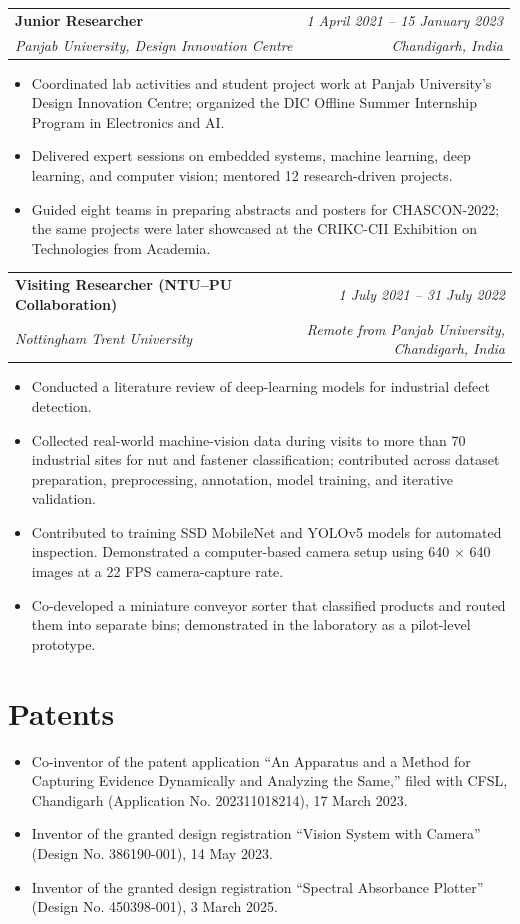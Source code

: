 \documentclass[a4paper,11pt]{article}
\makeatletter
\newcommand{\roleentry}[4]{%
  \begin{tabular*}{\textwidth}{@{}l@{\extracolsep{\fill}}r@{}}
    \textbf{#1} & \textit{#2} \\
    \textit{#3} & \textit{#4} \\
  \end{tabular*}\par\vspace{-3pt}%
}
\newcommand{\cvbullet}[1]{\item #1}
\makeatother
\begin{document}
\roleentry{Junior Researcher}{1 April 2021 -- 15 January 2023}{Panjab University, Design Innovation Centre}{Chandigarh, India}
\begin{itemize}
  \cvbullet{Coordinated lab activities and student project work at Panjab University's Design Innovation Centre; organized the DIC Offline Summer Internship Program in Electronics and AI.}
  \cvbullet{Delivered expert sessions on embedded systems, machine learning, deep learning, and computer vision; mentored 12 research-driven projects.}
  \cvbullet{Guided eight teams in preparing abstracts and posters for CHASCON-2022; the same projects were later showcased at the CRIKC-CII Exhibition on Technologies from Academia.}
\end{itemize}

\roleentry{Visiting Researcher (NTU--PU Collaboration)}{1 July 2021 -- 31 July 2022}{Nottingham Trent University}{Remote from Panjab University, Chandigarh, India}
\begin{itemize}
  \cvbullet{Conducted a literature review of deep-learning models for industrial defect detection.}
  \cvbullet{Collected real-world machine-vision data during visits to more than 70 industrial sites for nut and fastener classification; contributed across dataset preparation, preprocessing, annotation, model training, and iterative validation.}
  \cvbullet{Contributed to training SSD MobileNet and YOLOv5 models for automated inspection. Demonstrated a computer-based camera setup using 640 $\times$ 640 images at a 22 FPS camera-capture rate.}
  \cvbullet{Co-developed a miniature conveyor sorter that classified products and routed them into separate bins; demonstrated in the laboratory as a pilot-level prototype.}
\end{itemize}

\section*{Patents}
\begin{itemize}
  \cvbullet{Co-inventor of the patent application ``An Apparatus and a Method for Capturing Evidence Dynamically and Analyzing the Same,'' filed with CFSL, Chandigarh (Application No. 202311018214), 17 March 2023.}
  \cvbullet{Inventor of the granted design registration ``Vision System with Camera'' (Design No. 386190-001), 14 May 2023.}
  \cvbullet{Inventor of the granted design registration ``Spectral Absorbance Plotter'' (Design No. 450398-001), 3 March 2025.}
\end{itemize}
\end{document}
